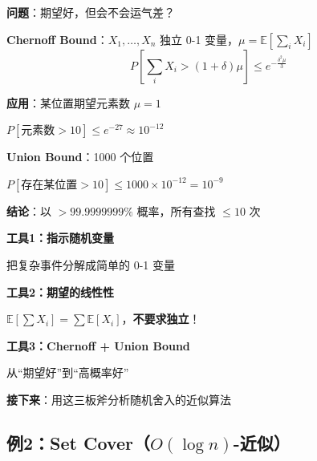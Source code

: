 \documentclass[12pt, a4paper]{ctexart}
\begin{document}
\begin{blackboard}

\textbf{问题}：期望好，但会不会运气差？

\textbf{Chernoff Bound}：$X_1, \ldots, X_n$ 独立 0-1 变量，$\mu = \mathbb{E}[\sum_i X_i]$
\[
P\left[\sum_i X_i > (1+\delta)\mu\right] \leq e^{-\frac{\delta^2 \mu}{3}}
\]

\textbf{应用}：某位置期望元素数 $\mu = 1$

$P[\text{元素数} > 10] \leq e^{-27} \approx 10^{-12}$

\textbf{Union Bound}：1000 个位置

$P[\text{存在某位置} > 10] \leq 1000 \times 10^{-12} = 10^{-9}$

\textbf{结论}：以 $> 99.9999999\%$ 概率，所有查找 $\leq 10$ 次

\end{blackboard}

\begin{insight}[随机化分析的三板斧]

\textbf{工具1：指示随机变量}

把复杂事件分解成简单的 0-1 变量

\textbf{工具2：期望的线性性}

$\mathbb{E}[\sum X_i] = \sum \mathbb{E}[X_i]$，\textbf{不要求独立}！

\textbf{工具3：Chernoff + Union Bound}

从``期望好''到``高概率好''

\textbf{接下来}：用这三板斧分析随机舍入的近似算法

\end{insight}

\subsection{例2：Set Cover（$O(\log n)$-近似）}
\end{document}
